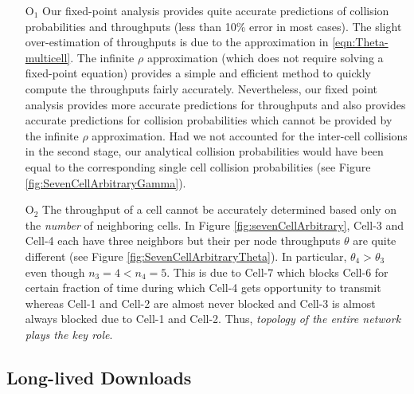 \documentclass[10pt,a4paper,journal]{IEEEtran}
\theoremstyle{definition}
\theoremstyle{remark}
\theoremstyle{plain}
\begin{document}
\begin{itemize}

\item [O$_1$] Our fixed-point analysis provides quite accurate predictions of collision probabilities and throughputs (less than 10\% error in most cases). The slight over-estimation of throughputs is due to the approximation in \eqref{eqn:Theta-multicell}. The infinite $\rho$ approximation (which does not require solving a fixed-point equation) provides a simple and efficient method to quickly compute the throughputs fairly accurately. Nevertheless, our fixed point analysis provides more accurate predictions for throughputs and also provides accurate predictions for collision probabilities which cannot be provided by the infinite $\rho$ approximation. Had we not accounted for the inter-cell collisions in the second stage, our analytical collision probabilities would have been equal to the corresponding single cell collision probabilities (see Figure \ref{fig:SevenCellArbitraryGamma}). 

\item [O$_2$] The throughput of a cell cannot be accurately determined based only on the \textit{number} of neighboring cells. In Figure \ref{fig:sevenCellArbitrary}, Cell-3 and Cell-4 each have three neighbors but their per node throughputs $\theta$ are quite different (see Figure \ref{fig:SevenCellArbitraryTheta}). In particular, $\theta_4 > \theta_3$ even though $n_3 = 4 < n_4 = 5$. This is due to Cell-7 which blocks Cell-6 for certain fraction of time during which Cell-4 gets opportunity to transmit whereas Cell-1 and Cell-2 are almost never blocked and Cell-3 is almost always blocked due to Cell-1 and Cell-2.  Thus, \textit{topology of the entire network plays the key role}. 

\end{itemize}



\subsection{Long-lived Downloads}
\label{subsec:results-TCP-long}
\end{document}
